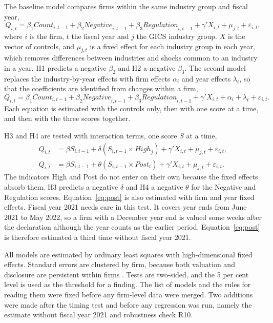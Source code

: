 \documentclass[12pt,a4paper]{article}
\begin{document}
The baseline model compares firms within the same industry group and fiscal year,
\begin{equation}
Q_{i,t} = \beta_1 \mathit{Count}_{i,t-1} + \beta_2 \mathit{Negative}_{i,t-1} + \beta_3 \mathit{Regulation}_{i,t-1} + \gamma' X_{i,t} + \mu_{j,t} + \varepsilon_{i,t},
\label{eq:baseline}
\end{equation}
where $i$ is the firm, $t$ the fiscal year and $j$ the GICS industry group. $X$ is the vector of controls, and $\mu_{j,t}$ is a fixed effect for each industry group in each year, which removes differences between industries and shocks common to an industry in a year. H1 predicts a negative $\beta_2$ and H2 a negative $\beta_3$. The second model replaces the industry-by-year effects with firm effects $\alpha_i$ and year effects $\lambda_t$, so that the coefficients are identified from changes within a firm,
\begin{equation}
Q_{i,t} = \beta_1 \mathit{Count}_{i,t-1} + \beta_2 \mathit{Negative}_{i,t-1} + \beta_3 \mathit{Regulation}_{i,t-1} + \gamma' X_{i,t} + \alpha_i + \lambda_t + \varepsilon_{i,t}.
\label{eq:firm}
\end{equation}
Each equation is estimated with the controls only, then with one score at a time, and then with the three scores together.

H3 and H4 are tested with interaction terms, one score $S$ at a time,
\begin{align}
Q_{i,t} &= \beta S_{i,t-1} + \delta \left( S_{i,t-1} \times \mathit{High}_{j} \right) + \gamma' X_{i,t} + \mu_{j,t} + \varepsilon_{i,t}, \label{eq:high}\\
Q_{i,t} &= \beta S_{i,t-1} + \theta \left( S_{i,t-1} \times \mathit{Post}_{t} \right) + \gamma' X_{i,t} + \mu_{j,t} + \varepsilon_{i,t}. \label{eq:post}
\end{align}
The indicators High and Post do not enter on their own because the fixed effects absorb them. H3 predicts a negative $\delta$ and H4 a negative $\theta$ for the Negative and Regulation scores. Equation~\eqref{eq:post} is also estimated with firm and year fixed effects. Fiscal year 2021 needs care in this test. It covers year ends from June 2021 to May 2022, so a firm with a December year end is valued some weeks after the declaration although the year counts as the earlier period. Equation~\eqref{eq:post} is therefore estimated a third time without fiscal year 2021.

All models are estimated by ordinary least squares with high-dimensional fixed effects. Standard errors are clustered by firm, because both valuation and disclosure are persistent within firms \citep{petersen2009}. Tests are two-sided, and the 5 per cent level is used as the threshold for a finding. The list of models and the rules for reading them were fixed before any firm-level data were merged. Two additions were made after the timing test and before any regression was run, namely the estimate without fiscal year 2021 and robustness check R10.
\end{document}
